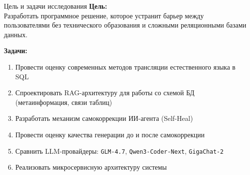 \documentclass[10pt, aspectratio=169, unicode]{beamer}
\begin{document}
\begin{frame}{Цель и задачи исследования}
  \textbf{Цель:}\\[4pt]
  Разработать программное решение, которое устранит барьер между пользователями без технического образования и сложными реляционными базами данных.

  \vspace{8pt}
  \textbf{Задачи:}
  \begin{enumerate}
    \item Провести оценку современных методов трансляции естественного языка в SQL
    \item Спроектировать RAG-архитектуру для работы со схемой БД (метаинформация, связи таблиц)
    \item Разработать механизм самокоррекции ИИ-агента (Self-Heal)
    \item Провести оценку качества генерации до и после самокоррекции
    \item Сравнить LLM-провайдеры: \texttt{GLM-4.7}, \texttt{Qwen3-Coder-Next}, \texttt{GigaChat-2}
    \item Реализовать микросервисную архитектуру системы
  \end{enumerate}
\end{frame}
\end{document}
